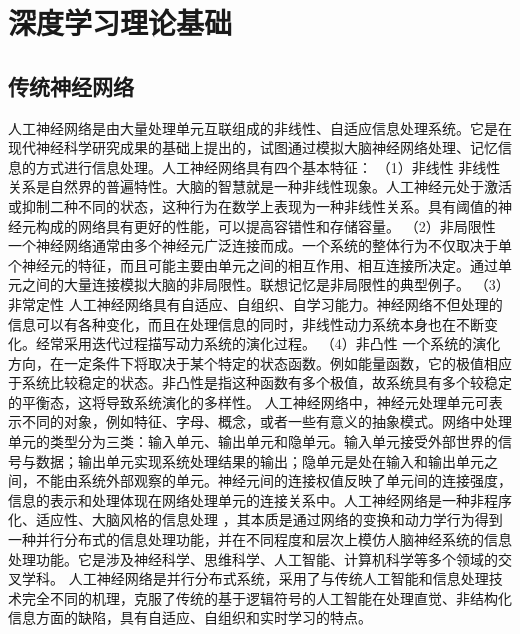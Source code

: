 \documentclass[UTF8]{ctexart}
\begin{document}
\section{深度学习理论基础}
\subsection{传统神经网络}
人工神经网络是由大量处理单元互联组成的非线性、自适应信息处理系统。它是在现代神经科学研究成果的基础上提出的，试图通过模拟大脑神经网络处理、记忆信息的方式进行信息处理。人工神经网络具有四个基本特征：
（1）非线性 非线性关系是自然界的普遍特性。大脑的智慧就是一种非线性现象。人工神经元处于激活或抑制二种不同的状态，这种行为在数学上表现为一种非线性关系。具有阈值的神经元构成的网络具有更好的性能，可以提高容错性和存储容量。
（2）非局限性 一个神经网络通常由多个神经元广泛连接而成。一个系统的整体行为不仅取决于单个神经元的特征，而且可能主要由单元之间的相互作用、相互连接所决定。通过单元之间的大量连接模拟大脑的非局限性。联想记忆是非局限性的典型例子。
（3）非常定性 人工神经网络具有自适应、自组织、自学习能力。神经网络不但处理的信息可以有各种变化，而且在处理信息的同时，非线性动力系统本身也在不断变化。经常采用迭代过程描写动力系统的演化过程。
（4）非凸性 一个系统的演化方向，在一定条件下将取决于某个特定的状态函数。例如能量函数，它的极值相应于系统比较稳定的状态。非凸性是指这种函数有多个极值，故系统具有多个较稳定的平衡态，这将导致系统演化的多样性。
人工神经网络中，神经元处理单元可表示不同的对象，例如特征、字母、概念，或者一些有意义的抽象模式。网络中处理单元的类型分为三类：输入单元、输出单元和隐单元。输入单元接受外部世界的信号与数据；输出单元实现系统处理结果的输出；隐单元是处在输入和输出单元之间，不能由系统外部观察的单元。神经元间的连接权值反映了单元间的连接强度，信息的表示和处理体现在网络处理单元的连接关系中。人工神经网络是一种非程序化、适应性、大脑风格的信息处理 ，其本质是通过网络的变换和动力学行为得到一种并行分布式的信息处理功能，并在不同程度和层次上模仿人脑神经系统的信息处理功能。它是涉及神经科学、思维科学、人工智能、计算机科学等多个领域的交叉学科。
人工神经网络是并行分布式系统，采用了与传统人工智能和信息处理技术完全不同的机理，克服了传统的基于逻辑符号的人工智能在处理直觉、非结构化信息方面的缺陷，具有自适应、自组织和实时学习的特点。
\end{document}
